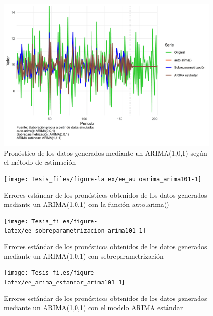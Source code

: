 \documentclass[
]{article}
\begin{document}
\begin{figure}[H]
\includegraphics[width=1\linewidth,height=1\textheight]{Tesis_files/figure-latex/pronostico_arima101-1} \caption{Pronóstico de los datos generados mediante un ARIMA(1,0,1) según el método de estimación}\label{fig:pronostico_arima101}
\end{figure}

\begin{figure}[H]
\texttt{[image: Tesis\_files/figure-latex/ee\_autoarima\_arima101-1]} \caption{Errores estándar de los pronósticos obtenidos de los datos generados mediante un ARIMA(1,0,1) con la función auto.arima()}\label{fig:ee_autoarima_arima101}
\end{figure}

\begin{figure}[H]
\texttt{[image: Tesis\_files/figure-latex/ee\_sobreparametrizacion\_arima101-1]} \caption{Errores estándar de los pronósticos obtenidos de los datos generados mediante un ARIMA(1,0,1) con sobreparametrización}\label{fig:ee_sobreparametrizacion_arima101}
\end{figure}

\begin{figure}[H]
\texttt{[image: Tesis\_files/figure-latex/ee\_arima\_estandar\_arima101-1]} \caption{Errores estándar de los pronósticos obtenidos de los datos generados mediante un ARIMA(1,0,1) con el modelo ARIMA estándar}\label{fig:ee_arima_estandar_arima101}
\end{figure}
\end{document}
